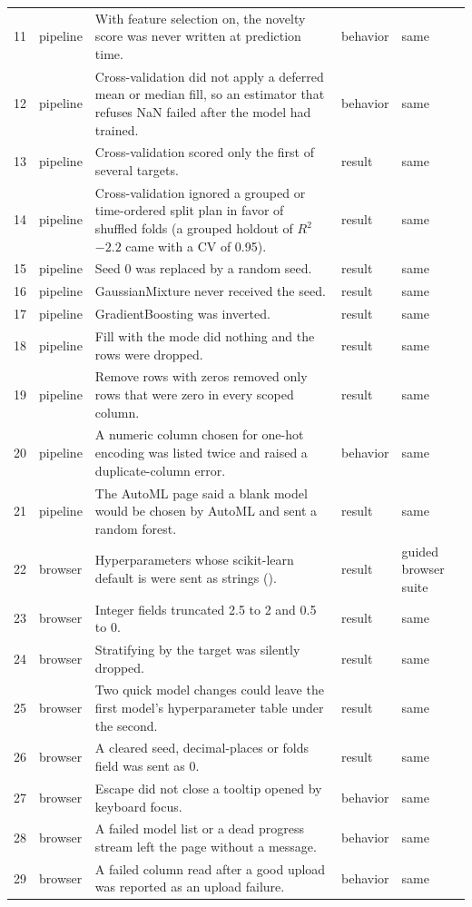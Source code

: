 \begin{longtable}{@{}L{0.5cm}L{1.6cm}L{7.6cm}L{1.6cm}L{3.4cm}@{}}
11 & pipeline & With feature selection on, the novelty score was never written at prediction time. & behavior & same \\
12 & pipeline & Cross-validation did not apply a deferred mean or median fill, so an estimator that refuses NaN failed after the model had trained. & behavior & same \\
13 & pipeline & Cross-validation scored only the first of several targets. & result & same \\
14 & pipeline & Cross-validation ignored a grouped or time-ordered split plan in favor of shuffled folds (a grouped holdout of $R^2$ $-2.2$ came with a CV of 0.95). & result & same \\
15 & pipeline & Seed 0 was replaced by a random seed. & result & same \\
16 & pipeline & GaussianMixture never received the seed. & result & same \\
17 & pipeline & GradientBoosting  was inverted. & result & same \\
18 & pipeline & Fill with the mode did nothing and the rows were dropped. & result & same \\
19 & pipeline & Remove rows with zeros removed only rows that were zero in every scoped column. & result & same \\
20 & pipeline & A numeric column chosen for one-hot encoding was listed twice and raised a duplicate-column error. & behavior & same \\
21 & pipeline & The AutoML page said a blank model would be chosen by AutoML and sent a random forest. & result & same \\
22 & browser & Hyperparameters whose scikit-learn default is  were sent as strings (). & result & guided browser suite \\
23 & browser & Integer fields truncated 2.5 to 2 and 0.5 to 0. & result & same \\
24 & browser & Stratifying by the target was silently dropped. & result & same \\
25 & browser & Two quick model changes could leave the first model's hyperparameter table under the second. & result & same \\
26 & browser & A cleared seed, decimal-places or folds field was sent as 0. & result & same \\
27 & browser & Escape did not close a tooltip opened by keyboard focus. & behavior & same \\
28 & browser & A failed model list or a dead progress stream left the page without a message. & behavior & same \\
29 & browser & A failed column read after a good upload was reported as an upload failure. & behavior & same \\
\bottomrule
\end{longtable}\normalsize

